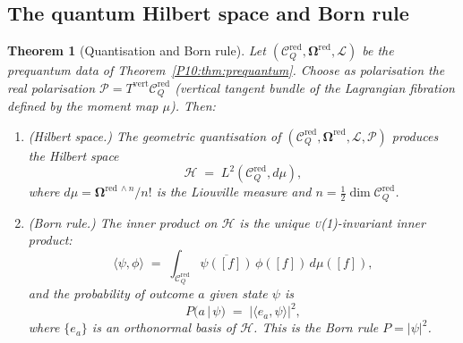 \documentclass[11pt,a4paper]{article}
\newtheorem{theorem}{Theorem}[section]
\theoremstyle{definition}
\theoremstyle{remark}
\newcommand{\Hil}{\mathcal{H}}
\newcommand{\CQr}{\mathcal{C}_Q^{\mathrm{red}}}
\newcommand{\bOmega}{\boldsymbol{\Omega}}
\newcommand{\dmu}{d\mu}
\begin{document}
\subsection{The quantum Hilbert space and Born rule}

\begin{theorem}[Quantisation and Born rule]
\label{P10:thm:quantisation}
Let $(\CQr,\bOmega^{\mathrm{red}},\mathcal{L})$ be the
prequantum data of Theorem~\ref{P10:thm:prequantum}.
Choose as polarisation the real polarisation
$\mathcal{P} = T^{\mathrm{vert}}\CQr$ (vertical tangent bundle
of the Lagrangian fibration defined by the moment map $\mu$).
Then:

\begin{enumerate}[label=\emph{(\roman*)}]
  \item \emph{(Hilbert space.)}
    The geometric quantisation of $(\CQr,\bOmega^{\mathrm{red}},
    \mathcal{L},\mathcal{P})$ produces the Hilbert space
    \begin{equation}
      \Hil \;=\; L^2(\CQr,\dmu),
      \label{P10:eq:Hilbert}
    \end{equation}
    where $\dmu = \bOmega^{\mathrm{red}\,\wedge n}/n!$
    is the Liouville measure and $n = \tfrac{1}{2}\dim\CQr$.

  \item \emph{(Born rule.)}
    The inner product on $\Hil$ is the unique \textsc{u}(1)-invariant
    inner product:
    \begin{equation}
      \langle\psi,\phi\rangle
      \;=\; \int_{\CQr} \overline{\psi([f])}\,\phi([f])\,\dmu([f]),
      \label{P10:eq:inner_product}
    \end{equation}
    and the probability of outcome $a$ given state $\psi$ is
    \begin{equation}
      P(a\,|\,\psi) \;=\; |\langle e_a,\psi\rangle|^2,
      \label{P10:eq:born}
    \end{equation}
    where $\{e_a\}$ is an orthonormal basis of $\Hil$.
    This is the Born rule $P=|\psi|^2$.
\end{enumerate}
\end{theorem}
\end{document}
